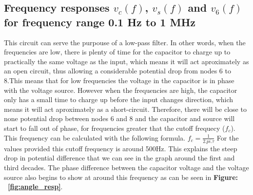 \subsection{Frequency responses $v_c(f)$, $v_s(f)$ and $v_6(f)$ for frequency range 0.1 Hz to 1 MHz}
\label{ref}
This circuit can serve the purpouse of a low-pass filter.
In other words, when the frequencies are low, there is plenty of time for the capacitor 
to charge up to practically the same voltage as the input, which means
it will act aproximately as an open circuit, thus allowing a considerable potential drop 
from nodes 6 to 8.This means that for low frequencies the voltage in the capacitor
is in phase with the voltage source. However when the frequencies are high, 
the capacitor only has a small time to charge up before the input changes direction, which 
means it will act aproximately as a short-circuit. Therefore, there will be close to none 
potential drop between nodes 6 and 8 and the capacitor and source will start to fall 
out of phase, for frequencies greater that the cutoff frequecy ($f_c$). 
This frequency can be calculated with the following formula. $f_c = \frac{1}{2.pi.\tau}$ 
For the values provided this cutoff frequency is around 500Hz. This explains the steep drop 
in potential difference that we can see in the graph around the first and third decades.
The phase difference between the capacitor voltage and the voltage source also begins to 
show at around this frequency as can be seen in \textbf{Figure: ~\ref{fig:angle_resp}}.
